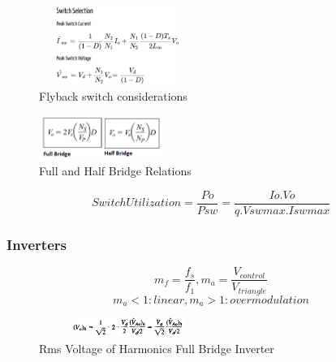 \documentclass[twocolumn, ]{article}
\begin{document}
  \begin{figure}[!ht]
	\includegraphics[width=2in,height=1in]{flybak_switch}
	\caption{Flyback switch considerations}
\end{figure}

\begin{figure}[!ht]
	\includegraphics[width=1.6in,height=.6in]{fullandhalfinout.png}
	\caption{Full and Half Bridge Relations}
\end{figure}

\begin{equation}
Switch Utilization= \frac{Po}{Psw}=\frac{Io.Vo}{q.Vswmax.Iswmax}
\end{equation}

\subsubsection*{Inverters}

$$ m_f=\dfrac{f_s}{f_1}, m_a=\dfrac{V_{control}}{V_{triangle}}$$
$$m_a<1: linear, m_a>1: overmodulation$$

\begin{figure}[!ht]
	\includegraphics[width=2.3in,height=0.25in]{RmsVoltageofHarmonicsFullBridgeInverter.png}
	\caption{Rms Voltage of Harmonics Full Bridge Inverter}
\end{figure}
\end{document}
